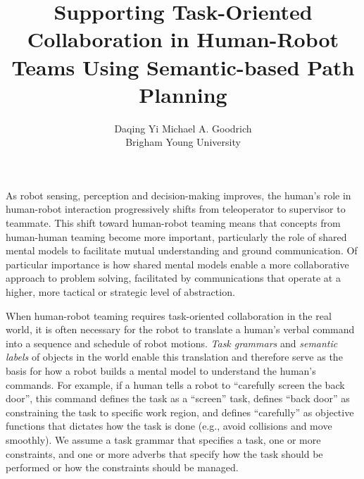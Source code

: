 \documentclass[12pt,a4paper]{article}
\begin{document}
\thispagestyle{empty}

\title{\textbf{Supporting Task-Oriented Collaboration in Human-Robot Teams Using Semantic-based Path Planning}}
\author{Daqing Yi \quad Michael A. Goodrich\\
Brigham Young University\\
}
\date{} %
\maketitle\thispagestyle{empty} %



As robot sensing, perception and decision-making improves, the human's role in human-robot interaction progressively shifts from teleoperator to supervisor to teammate. This shift toward human-robot teaming means that concepts from human-human teaming become more important, particularly the role of shared mental models to facilitate mutual understanding and ground communication. Of particular importance is how shared mental models enable a more collaborative approach to problem solving, facilitated by communications that operate at a higher, more tactical or strategic level of abstraction.  

When human-robot teaming requires task-oriented collaboration in the real world, it is often necessary for the robot to translate a human's verbal command into a sequence and schedule of robot motions. \emph{Task grammars} and \emph{semantic labels} of objects in the world enable this translation and therefore serve as the basis for how a robot builds a mental model to understand the human's commands. For example, if a human tells a robot to ``carefully screen the back door'', this command defines the task as a ``screen'' task, defines ``back door'' as constraining the task to  specific work region, and defines ``carefully'' as objective functions that dictates how the task is done (e.g., avoid collisions and move smoothly). We assume a task grammar that specifies a task, one or more constraints, and one or more adverbs that specify how the task should be performed or how the constraints should be managed.
\end{document}
